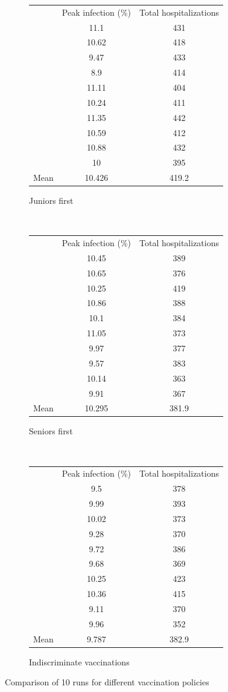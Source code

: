 \documentclass[titlepage]{article}
\begin{document}
\begin{figure}[h!]
\centering
\begin{subfigure}[b]{0.5\textwidth}
\centering
\begin{tabular}{rc|c}
& Peak infection (\%) & Total hospitalizations\\ \cline{2-3}
& 11.1  & 431\\
& 10.62 & 418\\
& 9.47  & 433\\
& 8.9   & 414\\
& 11.11 & 404\\
& 10.24 & 411\\
& 11.35 & 442\\
& 10.59 & 412\\
& 10.88 & 432\\
& 10    & 395\\ \hline
Mean & 10.426 & 419.2
\end{tabular}
\caption{Juniors first}
\end{subfigure}~
\begin{subfigure}[b]{0.5\textwidth}
\centering
\begin{tabular}{rc|c}
& Peak infection (\%) & Total hospitalizations\\ \cline{2-3}
& 10.45 & 389\\
& 10.65 & 376\\
& 10.25 & 419\\
& 10.86 & 388\\
& 10.1  & 384\\
& 11.05 & 373\\
& 9.97  & 377\\
& 9.57  & 383\\
& 10.14 & 363\\
& 9.91  & 367\\ \hline
Mean & 10.295 & 381.9
\end{tabular}
\caption{Seniors first}
\end{subfigure}\\
\begin{subfigure}[b]{0.5\textwidth}
\centering
\begin{tabular}{rc|c}
& Peak infection (\%) & Total hospitalizations\\ \cline{2-3}
& 9.5   & 378\\
& 9.99  & 393\\
& 10.02 & 373\\
& 9.28  & 370\\
& 9.72  & 386\\
& 9.68  & 369\\
& 10.25 & 423\\
& 10.36 & 415\\
& 9.11  & 370\\
& 9.96  & 352\\ \hline
Mean & 9.787 & 382.9
\end{tabular}
\caption{Indiscriminate vaccinations}
\end{subfigure}
\caption{Comparison of 10 runs for different vaccination policies}
\label{fig:10outs}
\end{figure}
\end{document}
